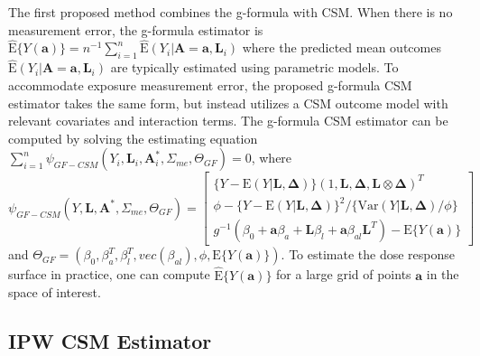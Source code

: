 \documentclass[useAMS,usenatbib,referee]{biom}
\begin{document}
\sloppy The first proposed method combines the g-formula with CSM. When there is no measurement error, the g-formula estimator is $\hat{\text{E}}\{ Y(\bm{a}) \} = n^{-1} \sum_{i=1}^{n} \hat{\text{E}}(Y_{i} | \bm{A} = \bm{a}, \bm{L}_{i})$ where the predicted mean outcomes $\hat{\text{E}}(Y_{i} | \bm{A} = \bm{a}, \bm{L}_{i})$ are typically estimated using parametric models. To accommodate exposure measurement error, the proposed g-formula CSM estimator takes the same form, but instead utilizes a CSM outcome model with relevant covariates and interaction terms. The g-formula CSM estimator can be computed by solving the estimating equation $\sum_{i=1}^{n} \psi_{GF-CSM}(Y_{i}, \bm{L}_{i}, \bm{A}_{i}^{*}, \Sigma_{me}, \Theta_{GF}) = 0$, where
\begin{equation}
    \psi_{GF-CSM}(Y, \bm{L}, \bm{A}^{*}, \Sigma_{me}, \Theta_{GF}) =
    \begin{bmatrix}
       \{ Y - \text{E}(Y | \bm{L}, \bm{\Delta}) \} (1, \bm{L}, \bm{\Delta}, \bm{L} \otimes \bm{\Delta})^{T} \\
        \phi - \{ Y - \text{E}(Y | \bm{L}, \bm{\Delta}) \}^{2} / \{ \text{Var}(Y | \bm{L}, \bm{\Delta}) / \phi \} \\
        g^{-1}(\beta_{0} + \bm{a}\beta_{a} + \bm{L}\beta_{l} +
        \bm{a}\beta_{al}\bm{L}^{T}) - \text{E} \{ Y(\bm{a}) \}
    \end{bmatrix}
\end{equation}
and $\Theta_{GF} = (\beta_{0}, \beta^{T}_{a}, \beta^{T}_{l}, vec(\beta_{al}), \phi, \text{E} \{ Y(\bm{a}) \})$. To estimate the dose response surface in practice, one can compute $\hat{\text{E}}\{ Y(\bm{a}) \}$ for a large grid of points $\bm{a}$ in the space of interest.

\subsection{IPW CSM Estimator}
\end{document}
